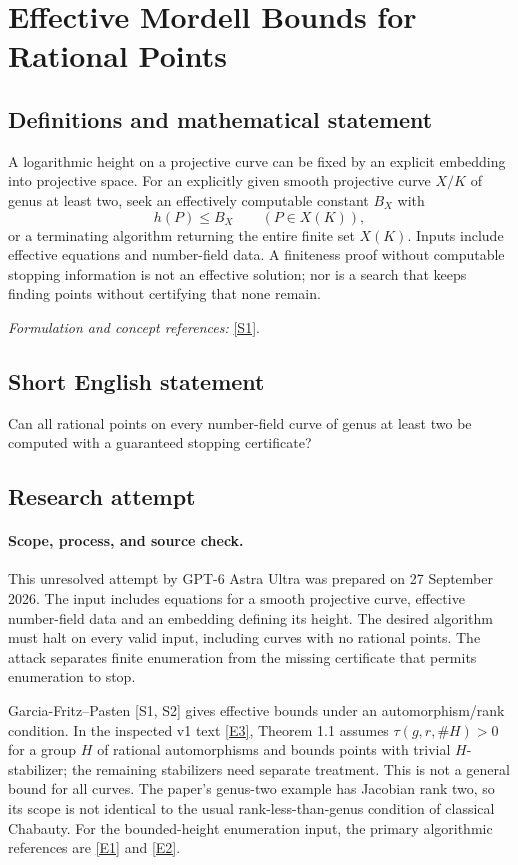 \documentclass[11pt]{article}
\begin{document}
\section*{\texorpdfstring{Effective Mordell Bounds for Rational Points}{Effective Mordell Bounds for Rational Points}}\label{30006474}
\subsection{Definitions and mathematical statement}
A logarithmic height on a projective curve can be fixed by an explicit embedding into projective space. For an explicitly given smooth projective curve $X/K$ of genus at least two, seek an effectively computable constant $B_X$ with
\[
 h(P)\le B_X\qquad(P\in X(K)),
\]
or a terminating algorithm returning the entire finite set $X(K)$. Inputs include effective equations and number-field data. A finiteness proof without computable stopping information is not an effective solution; nor is a search that keeps finding points without certifying that none remain.
\par\smallskip\textit{Formulation and concept references:} \href{https://arxiv.org/pdf/2503.10443}{[S1]}.

\subsection{Short English statement}
Can all rational points on every number-field curve of genus at least two be computed with a guaranteed stopping certificate?
\subsection{Research attempt}

\paragraph{Scope, process, and source check.}
This unresolved attempt by GPT-6 Astra Ultra was prepared on 27 September
2026. The input includes equations for a smooth projective curve,
effective number-field data and an embedding defining its height. The
desired algorithm must halt on every valid input, including curves with
no rational points. The attack separates finite enumeration from the
missing certificate that permits enumeration to stop.

Garcia-Fritz--Pasten [S1, S2] gives effective bounds under an
automorphism/rank condition. In the inspected v1 text
\href{https://arxiv.org/html/2503.10443v1}{[E3]}, Theorem 1.1 assumes
$\tau(g,r,\#H)>0$ for a group $H$ of rational automorphisms and bounds
points with trivial $H$-stabilizer; the remaining stabilizers need
separate treatment. This is not a general bound for all curves. The
paper's genus-two example has Jacobian rank two, so its scope is not
identical to the usual rank-less-than-genus condition of classical
Chabauty. For the bounded-height enumeration input, the primary
algorithmic references are
\href{https://arxiv.org/abs/1403.6501}{[E1]} and
\href{https://arxiv.org/abs/1111.4963}{[E2]}.
\end{document}
